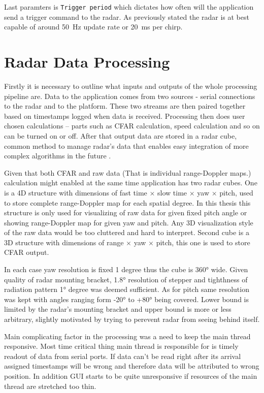 Last paramters is \texttt{Trigger period} which dictates how often will the application send a trigger command to the radar.
As previously stated the radar is at best capable of around 50~Hz update rate or 20~ms per chirp.


\chapter{Radar Data Processing}

Firstly it is necessary to outline what inputs and outputs of the whole processing pipeline are.
Data to the application comes from two sources - serial connections to the radar and to the platform.
These two streams are then paired together based on timestamps logged when data is received.
Processing then does user chosen calculations -- parts such as CFAR calculation, speed calculation and so on can be turned on or off.
After that output data are stored in a radar cube, common method to manage radar's data that enables easy integration of more complex algorithms in the future \cite{richards2022}.

Given that both CFAR and raw data (That is individual range-Doppler maps.) calculation might enabled at the same time application has two radar cubes.
One is a 4D structure with dimensions of fast time $\times$ slow time $\times$ yaw $\times$ pitch, used to store complete range-Doppler map for each spatial degree.
In this thesis this structure is only used for visualizing of raw data for given fixed pitch angle or showing range-Doppler map for given yaw and pitch.
Any 3D visualization style of the raw data would be too cluttered and hard to interpret.
Second cube is a 3D structure with dimensions of range $\times$ yaw $\times$ pitch, this one is used to store CFAR output.

In each case yaw resolution is fixed 1 degree thus the cube is 360° wide.
Given quality of radar mounting bracket, 1.8° resolution of stepper and tighthness of radiation pattern 1° degree was deemed sufficient.
As for pitch same resolution was kept with angles ranging form -20° to +80° being covered.
Lower bound is limited by the radar's mounting bracket and upper bound is more or less arbitrary, slightly motivated by trying to perevent radar from seeing behind itself.

Main complicating factor in the processing was a need to keep the main thread responsive.
Most time critical thing main thread is responsible for is timely readout of data from serial ports.
If data can't be read right after its arrival assigned timestamps will be wrong and therefore data will be attributed to wrong position.
In addition GUI starts to be quite unresponsive if resources of the main thread are stretched too thin.

